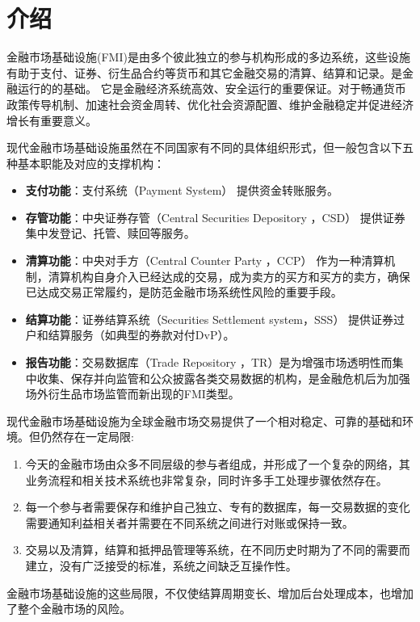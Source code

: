 \section{介绍}

金融市场基础设施(FMI)是由多个彼此独立的参与机构形成的多边系统，这些设施有助于支付、证券、衍生品合约等货币和其它金融交易的清算、结算和记录。是金融运行的的基础。
它是金融经济系统高效、安全运行的重要保证。对于畅通货币政策传导机制、加速社会资金周转、优化社会资源配置、维护金融稳定并促进经济增长有重要意义。

现代金融市场基础设施虽然在不同国家有不同的具体组织形式，但一般包含以下五种基本职能及对应的支撑机构：

\begin{itemize}
    \item [\dag] \textbf{支付功能}：支付系统（Payment System） 提供资金转账服务。
    \item [\dag] \textbf{存管功能}：中央证券存管（Central Securities Depository ，CSD） 提供证券集中发登记、托管、赎回等服务。
    \item [\dag] \textbf{清算功能}：中央对手方（Central Counter Party ，CCP） 作为一种清算机制，清算机构自身介入已经达成的交易，成为卖方的买方和买方的卖方，确保已达成交易正常履约，是防范金融市场系统性风险的重要手段。
    \item [\dag] \textbf{结算功能}：证券结算系统（Securities Settlement system，SSS） 提供证券过户和结算服务（如典型的券款对付DvP）。
    \item [\dag] \textbf{报告功能}：交易数据库（Trade Repository ，TR）是为增强市场透明性而集中收集、保存并向监管和公众披露各类交易数据的机构，是金融危机后为加强场外衍生品市场监管而新出现的FMI类型。
\end{itemize}

现代金融市场基础设施为全球金融市场交易提供了一个相对稳定、可靠的基础和环境。但仍然存在一定局限: 
\begin{enumerate}
    \item 今天的金融市场由众多不同层级的参与者组成，并形成了一个复杂的网络，其业务流程和相关技术系统也非常复杂，同时许多手工处理步骤依然存在。
    \item 每一个参与者需要保存和维护自己独立、专有的数据库，每一交易数据的变化需要通知利益相关者并需要在不同系统之间进行对账或保持一致。
    \item 交易以及清算，结算和抵押品管理等系统，在不同历史时期为了不同的需要而建立，没有广泛接受的标准，系统之间缺乏互操作性。
\end{enumerate}
金融市场基础设施的这些局限，不仅使结算周期变长、增加后台处理成本，也增加了整个金融市场的风险。

